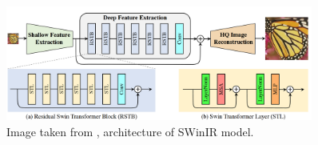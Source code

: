 \begin{figure}[h!]
    \includegraphics[width=0.9\textwidth]{models/sisr/imgs/swinir_model.png}
    \caption{Image taken from \cite{liangSwinIRImageRestoration2021a}, architecture of SWinIR model.}
    \label{fig:swinir_model}
\end{figure}
